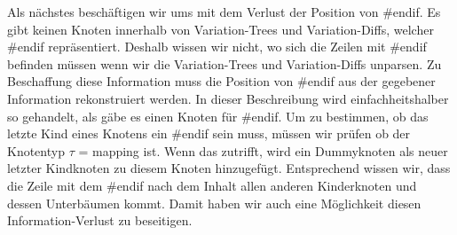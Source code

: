 Als nächstes beschäftigen wir ums mit dem  Verlust der Position von \#endif. Es gibt keinen Knoten innerhalb von Variation-Trees und Variation-Diffs, welcher \#endif repräsentiert. Deshalb wissen wir nicht, wo sich die Zeilen mit \#endif befinden müssen wenn wir die Variation-Trees und Variation-Diffs unparsen. Zu Beschaffung diese Information muss die Position von \#endif aus der gegebener Information rekonstruiert werden. In dieser Beschreibung wird einfachheitshalber so gehandelt, als gäbe es einen Knoten für \#endif.  Um zu bestimmen, ob das letzte Kind eines Knotens ein \#endif sein muss, müssen wir prüfen ob der Knotentyp $\tau$ = mapping ist. Wenn das zutrifft, wird ein Dummyknoten als neuer letzter Kindknoten zu diesem Knoten hinzugefügt. Entsprechend wissen wir, dass die Zeile mit dem \#endif nach dem Inhalt allen anderen Kinderknoten und dessen Unterbäumen kommt. Damit haben wir auch eine Möglichkeit diesen Information-Verlust zu beseitigen.\\

